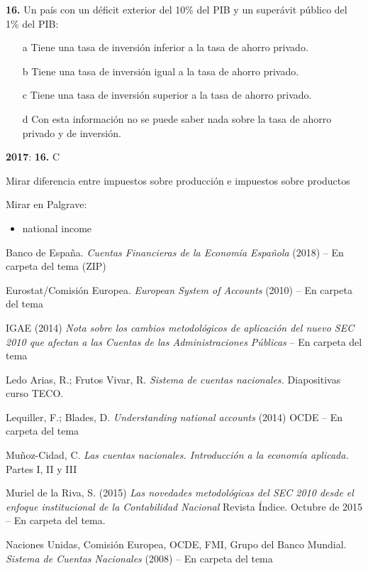 \documentclass{nuevotema}
\begin{document}
\textbf{16.} Un país con un déficit exterior del 10\% del PIB y un superávit público del 1\% del PIB:

\begin{itemize}
	\item[a] Tiene una tasa de inversión inferior a la tasa de ahorro privado.
	\item[b] Tiene una tasa de inversión igual a la tasa de ahorro privado.
	\item[c] Tiene una tasa de inversión superior a la tasa de ahorro privado.
	\item[d] Con esta información no se puede saber nada sobre la tasa de ahorro privado y de inversión.
\end{itemize}

\notas
\textbf{2017}: \textbf{16.} C

Mirar diferencia entre impuestos sobre producción e impuestos sobre productos

\bibliografia

Mirar en Palgrave:

\begin{itemize}
	\item national income
\end{itemize}

Banco de España. \textit{Cuentas Financieras de la Economía Española} (2018) -- En carpeta del tema (ZIP)

Eurostat/Comisión Europea. \textit{European System of Accounts} (2010) -- En carpeta del tema

IGAE (2014) \textit{Nota sobre los cambios metodológicos de aplicación del nuevo SEC 2010 que afectan a las Cuentas de las Administraciones Públicas} -- En carpeta del tema

Ledo Arias, R.; Frutos Vivar, R. \textit{Sistema de cuentas nacionales.} Diapositivas curso TECO.

Lequiller, F.; Blades, D. \textit{Understanding national accounts} (2014) OCDE -- En carpeta del tema

Muñoz-Cidad, C. \textit{Las cuentas nacionales. Introducción a la economía aplicada.} Partes I, II y III

Muriel de la Riva, S. (2015) \textit{Las novedades metodológicas del SEC 2010 desde el enfoque institucional de la Contabilidad Nacional} Revista Índice. Octubre de 2015 -- En carpeta del tema. 

Naciones Unidas, Comisión Europea, OCDE, FMI, Grupo del Banco Mundial. \textit{Sistema de Cuentas Nacionales} (2008) -- En carpeta del tema
\end{document}
